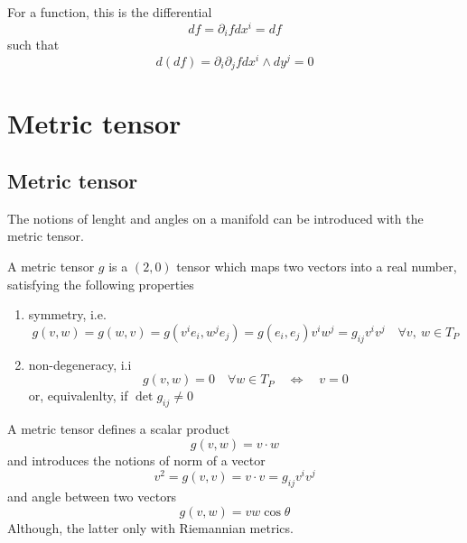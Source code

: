     For a function, this is the differential 
    \begin{equation*}
        df = \partial_i f dx^i = df
    \end{equation*}
    such that 
    \begin{equation*}
        d(df) = \partial_i \partial_j f dx^i \wedge dy^j = 0
    \end{equation*}

\chapter{Metric tensor}

\section{Metric tensor}

    The notions of lenght and angles on a manifold can be introduced with the metric tensor.

    A metric tensor $g$ is a $(2,0)$ tensor which maps two vectors into a real number, satisfying the following properties
    \begin{enumerate}
        \item symmetry, i.e.
            \begin{equation*}
                g(v,w) = g(w, v) = g(v^i e_i, w^j e_j) = g(e_i, e_j) v^i w^j = g_{ij} v^i v^j \quad \forall v, ~w \in T_P
            \end{equation*}
        \item non-degeneracy, i.i 
            \begin{equation*}
                g(v, w) = 0 \quad \forall w \in T_P \quad \iff \quad v=0 
            \end{equation*}
            or, equivalenlty, if $\det g_{ij} \neq 0$
    \end{enumerate}

    A metric tensor defines a scalar product 
    \begin{equation*}
        g(v, w) = v \cdot w
    \end{equation*}
    and introduces the notions of norm of a vector 
    \begin{equation*}
        v^2 = g(v,v) = v \cdot v = g_{ij} v^i v^j
    \end{equation*}
    and angle between two vectors 
    \begin{equation*}
        g(v, w) = v w \cos \theta
    \end{equation*}
    Although, the latter only with Riemannian metrics.

